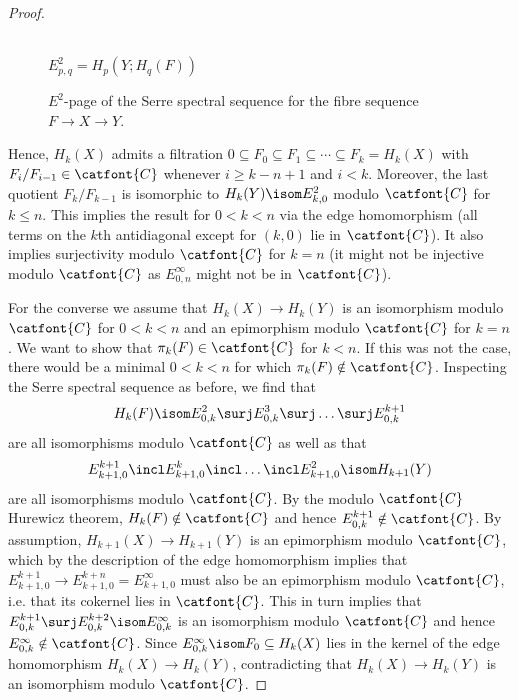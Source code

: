 \begin{proof}
\begin{figure}[ht]
 \\
		$E^2_{p, q} = H_p(Y; H_q(F))$
		\caption{$E^2$-page of the Serre spectral sequence for the fibre sequence $F \to X \to Y$.}
	\end{figure}
	Hence, $H_k(X)$ admits a filtration $0 \subseteq F_0 \subseteq F_1 \subseteq \cdots \subseteq F_k = H_k(X)$ with $F_i / F_{i - 1} \in \catfont{C}$ whenever $i \geq k - n + 1$ and $i < k$.
	Moreover, the last quotient $F_k / F_{k - 1}$ is isomorphic to $H_k(Y) \isom E^2_{k, 0}$ modulo $\catfont{C}$ for $k \leq n$.
	This implies the result for $0 < k < n$ via the edge homomorphism (all terms on the $k$th antidiagonal except for $(k, 0)$ lie in $\catfont{C}$).
	It also implies surjectivity modulo $\catfont{C}$ for $k = n$ (it might not be injective modulo $\catfont{C}$ as $E^\infty_{0, n}$ might not be in $\catfont{C}$).

	For the converse we assume that $H_k(X) \to H_k(Y)$ is an isomorphism modulo $\catfont{C}$ for $0 < k < n$ and an epimorphism modulo $\catfont{C}$ for $k = n$.
	We want to show that $\pi_k(F) \in \catfont{C}$ for $k < n$.
	If this was not the case, there would be a minimal $0 < k < n$ for which $\pi_k(F) \notin \catfont{C}$.
	Inspecting the Serre spectral sequence as before, we find that
	\begin{equation*}
		H_k(F) \isom E^2_{0, k} \surj E^3_{0, k} \surj \ldots \surj E^{k + 1}_{0, k}
	\end{equation*}
	are all isomorphisms modulo $\catfont{C}$ as well as that
	\begin{equation*}
		E^{k + 1}_{k + 1, 0} \incl E^k_{k + 1, 0} \incl \ldots \incl E^2_{k + 1, 0} \isom H_{k + 1}(Y)
	\end{equation*}
	are all isomorphisms modulo $\catfont{C}$.
	By the modulo $\catfont{C}$ Hurewicz theorem, $H_k(F) \notin \catfont{C}$ and hence $E^{k + 1}_{0, k} \notin \catfont{C}$.
	By assumption, $H_{k + 1}(X) \to H_{k + 1}(Y)$ is an epimorphism modulo $\catfont{C}$, which by the description of the edge homomorphism implies that $E^{k + 1}_{k + 1, 0} \to E^{k + n}_{k + 1, 0} = E^\infty_{k + 1, 0}$ must also be an epimorphism modulo $\catfont{C}$, i.e. that its cokernel lies in $\catfont{C}$.
	This in turn implies that $E^{k + 1}_{0, k} \surj E^{k + 2}_{0, k} \isom E^\infty_{0, k}$ is an isomorphism modulo $\catfont{C}$ and hence $E^\infty_{0, k} \notin \catfont{C}$.
	Since $E^\infty_{0, k} \isom F_0 \subseteq H_k(X)$ lies in the kernel of the edge homomorphism $H_k(X) \to H_k(Y)$, contradicting that $H_k(X) \to H_k(Y)$ is an isomorphism modulo $\catfont{C}$.
\end{proof}
